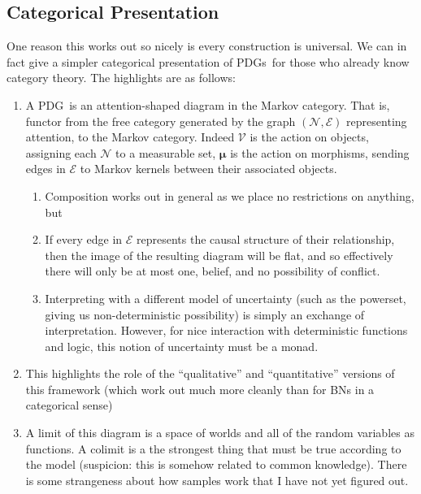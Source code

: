 \documentclass{article}
\newcommand{\bmu}{\boldsymbol{\mu}}
\newcommand{\Ed}{\mathcal E}
\newcommand{\MN}{PDG}
\newcommand{\MNs}{\MN s}
\numberwithin{equation}{section}
\begin{document}
\begin{notfocus}
\begin{vcat}
		\section{Categorical Presentation}
		One reason this works out so nicely is every construction is universal. We can in fact give a simpler categorical presentation of \MNs\ for those who already know category theory. The highlights are as follows:
		\begin{enumerate}
			\item A \MN\ is an attention-shaped diagram in the Markov category. That is, functor from the free category generated by the graph $(\mathcal N, \Ed)$ representing attention, to the Markov category. Indeed $\mathcal V$ is the action on objects, assigning each $\mathcal N$ to a measurable set, $\bmu$ is the action on morphisms, sending edges in $\Ed$ to Markov kernels between their associated objects. 
			\begin{enumerate}
				\item Composition works out in general as we place no restrictions on anything, but
				\item If every edge in $\Ed$ represents the causal structure of their relationship, then the image of the resulting diagram will be flat, and so effectively there will only be at most one, belief, and no possibility of conflict.
				\item Interpreting with a different model of uncertainty (such as the powerset, giving us non-deterministic possibility) is simply an exchange of interpretation. However, for nice interaction with deterministic functions and logic, this notion of uncertainty must be a monad.
			\end{enumerate}
			
			\item This highlights the role of the ``qualitative'' and ``quantitative'' versions of this framework (which work out much more cleanly than for BNs in a categorical sense)
			
			\item A limit of this diagram is a space of worlds and all of the random variables as functions. A colimit is a the strongest thing that must be true according to the model (suspicion: this is somehow related to common knowledge). There is some strangeness about how samples work that I have not yet figured out.
		\end{enumerate}
		

\end{vcat}
\end{notfocus}
\end{document}
